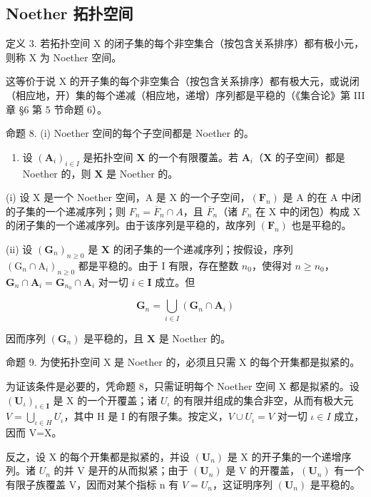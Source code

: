\subsection{Noether 拓扑空间}

定义 3. 若拓扑空间 X 的闭子集的每个非空集合（按包含关系排序）都有极小元，则称 X 为 Noether 空间。

这等价于说 X 的开子集的每个非空集合（按包含关系排序）都有极大元，或说闭（相应地，开）集的每个递减（相应地，递增）序列都是平稳的（《集合论》第 III 章 §6 第 5 节命题 6）。

命题 8. (i) Noether 空间的每个子空间都是 Noether 的。

\begin{enumerate}
\def\labelenumi{(\roman{enumi})}
\setcounter{enumi}{1}
\item
  设 \((\mathbf{A}_i)_{i\in I}\) 是拓扑空间 \(\mathbf{X}\) 的一个有限覆盖。若 \(\mathbf{A}_i\)（\(\mathbf{X}\) 的子空间）都是 Noether 的，则 \(\mathbf{X}\) 是 Noether 的。

\end{enumerate}

(i) 设 X 是一个 Noether 空间，A 是 X 的一个子空间，\((\mathbf{F}_{n})\) 是 A 的在 A 中闭的子集的一个递减序列；则 \(F_{n} = \overline{F}_{n} \cap A\)，且 \(\overline{F}_{n}\)（诸 \(F_{n}\) 在 X 中的闭包）构成 X 的闭子集的一个递减序列。由于该序列是平稳的，故序列 \((\mathbf{F}_{n})\) 也是平稳的。

(ii) 设 \((\mathbf{G}_n)_{n\geqslant 0}\) 是 \(\mathbf{X}\) 的闭子集的一个递减序列；按假设，序列 \((\mathrm{G}_n\cap \mathrm{A}_i)_{n\geqslant 0}\) 都是平稳的。由于 I 有限，存在整数 \(n_0\)，使得对 \(n\geqslant n_0\)，\(\mathbf{G}_n\cap \mathbf{A}_i = \mathbf{G}_{n_0}\cap \mathbf{A}_i\) 对一切 \(i\in \mathbf{I}\) 成立。但

\[
\mathbf {G} _ {n} = \bigcup_ {i \in I} \left(\mathbf {G} _ {n} \cap \mathbf {A} _ {i}\right)
\]

因而序列 \((\mathbf{G}_n)\) 是平稳的，且 \(\mathbf{X}\) 是 Noether 的。

命题 9. 为使拓扑空间 X 是 Noether 的，必须且只需 X 的每个开集都是拟紧的。

为证该条件是必要的，凭命题 8，只需证明每个 Noether 空间 X 都是拟紧的。设 \((\mathbf{U}_{\iota})_{\iota\in\mathbf{I}}\) 是 X 的一个开覆盖；诸 \(U_{\iota}\) 的有限并组成的集合非空，从而有极大元 \(V=\bigcup_{\iota\in H}U_{\iota}\)，其中 H 是 I 的有限子集。按定义，\(V\cup U_{\iota}=V\) 对一切 \(\iota\in I\) 成立，因而 V=X。

反之，设 X 的每个开集都是拟紧的，并设 \((\mathbf{U}_{n})\) 是 X 的开子集的一个递增序列。诸 \(U_{n}\) 的并 V 是开的从而拟紧；由于 \((\mathbf{U}_{n})\) 是 V 的开覆盖，\((\mathbf{U}_{n})\) 有一个有限子族覆盖 V，因而对某个指标 n 有 \(V = U_{n}\)，这证明序列 \((\mathbf{U}_{n})\) 是平稳的。

